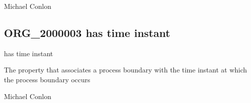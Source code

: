 \documentclass[letterpaper,10pt,english]{sphinxmanual}
\begin{document}
\begin{sphinxShadowBox}

\sphinxAtStartPar
Michael Conlon 
\end{sphinxShadowBox}
\begin{quote}

\ignorespaces \end{quote}


\subsection{ORG\_2000003 \sphinxhyphen{} has time instant}
\label{\detokenize{doc-ORG_2000003:org-2000003-has-time-instant}}\label{\detokenize{doc-ORG_2000003:index-0}}\label{\detokenize{doc-ORG_2000003::doc}}
\begin{sphinxShadowBox}

\sphinxAtStartPar
has time instant
\end{sphinxShadowBox}

\begin{sphinxShadowBox}

\sphinxAtStartPar
{}
\end{sphinxShadowBox}

\begin{sphinxShadowBox}

\sphinxAtStartPar
The property that associates a process boundary with the time instant at which the process boundary occurs
\end{sphinxShadowBox}

\begin{sphinxShadowBox}

\sphinxAtStartPar
Michael Conlon 
\end{sphinxShadowBox}

\begin{sphinxShadowBox}

\sphinxAtStartPar
{\hyperref[\detokenize{doc-BFO_0000035::doc}]{}}
\end{sphinxShadowBox}
\end{document}
